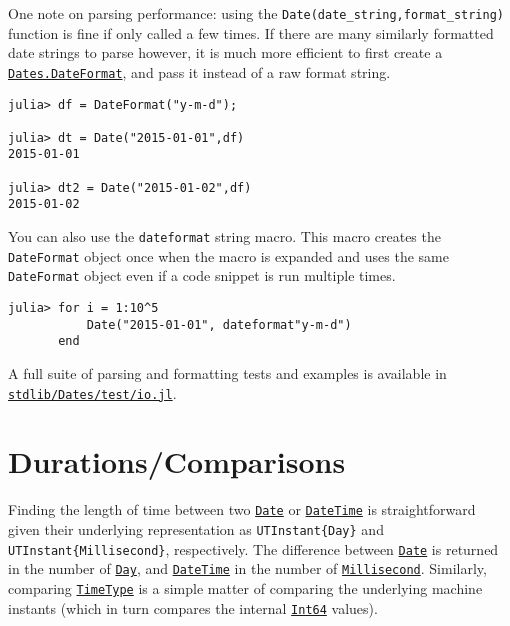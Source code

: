 One note on parsing performance: using the \texttt{Date(date\_string,format\_string)} function is fine if only called a few times. If there are many similarly formatted date strings to parse however, it is much more efficient to first create a \hyperlink{18093459443158853001}{\texttt{Dates.DateFormat}}, and pass it instead of a raw format string.




\begin{verbatim}
julia> df = DateFormat("y-m-d");

julia> dt = Date("2015-01-01",df)
2015-01-01

julia> dt2 = Date("2015-01-02",df)
2015-01-02
\end{verbatim}



You can also use the \texttt{dateformat{\textquotedbl}{\textquotedbl}} string macro. This macro creates the \texttt{DateFormat} object once when the macro is expanded and uses the same \texttt{DateFormat} object even if a code snippet is run multiple times.




\begin{verbatim}
julia> for i = 1:10^5
           Date("2015-01-01", dateformat"y-m-d")
       end
\end{verbatim}



A full suite of parsing and formatting tests and examples is available in \href{https://github.com/JuliaLang/julia/blob/master/stdlib/Dates/test/io.jl}{\texttt{stdlib/Dates/test/io.jl}}.



\hypertarget{9675062304126123157}{}


\section{Durations/Comparisons}



Finding the length of time between two \hyperlink{4488183467971164548}{\texttt{Date}} or \hyperlink{17572689933274889838}{\texttt{DateTime}} is straightforward given their underlying representation as \texttt{UTInstant\{Day\}} and \texttt{UTInstant\{Millisecond\}}, respectively. The difference between \hyperlink{4488183467971164548}{\texttt{Date}} is returned in the number of \hyperlink{13217464551942182596}{\texttt{Day}}, and \hyperlink{17572689933274889838}{\texttt{DateTime}} in the number of \hyperlink{9366634148855607364}{\texttt{Millisecond}}. Similarly, comparing \hyperlink{4438614350756187528}{\texttt{TimeType}} is a simple matter of comparing the underlying machine instants (which in turn compares the internal \hyperlink{7720564657383125058}{\texttt{Int64}} values).




